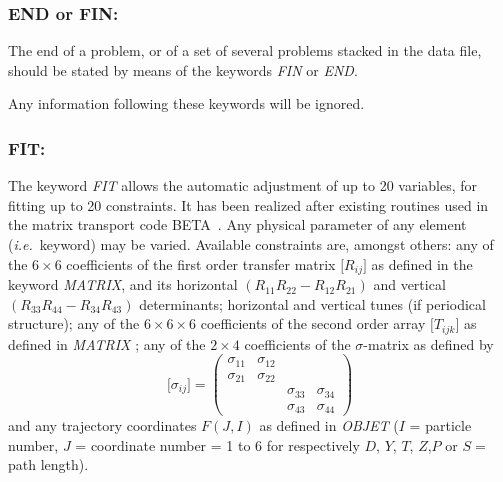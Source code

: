 \subsubsection*{END or FIN: \ENDTitl}  \label{FIN}  \label{END} 
\medskip

The end of a problem, or of a set of several problems stacked in 
the data file, should be stated by means of the keywords \textsl{FIN} or
\textsl{END}.  
\bigskip

\noindent Any information following these keywords will be ignored. 

\newpage

\subsubsection*{FIT:  \FITTitl}  \label{FIT} 
\medskip

 The keyword \textsl{FIT} allows the automatic adjustment of up to 20 
variables, for fitting up to 20 constraints. It has been realized 
after existing routines used in the matrix transport code BETA~\cite{Biblio10}. %
Any physical parameter of any element (\emph{i.e.}~keyword) may 
be varied. Available constraints  are, amongst others:  any of the $6 \times 6$
coefficients of the first order transfer matrix $ \lbrack R_{ij}\rbrack $ as defined in the
keyword \textsl{MATRIX}, and its horizontal $ (R_{11 }R_{22} -R_{12} R_{21}) $ and
vertical $ (R_{33} R_{44}- R_{34} R_{43}) $ determinants; horizontal and vertical tunes (if 
periodical structure);  any of the
$6\times 6 \times6 $ coefficients of the second order array $ \lbrack T_{ijk}\rbrack $ 
as defined in \textsl{MATRIX} ; any of the $ 2 \times 4 $ coefficients of the 
\mbox{$\sigma$-matrix} as defined by
%
$$ \lbrack \sigma_{ ij}\rbrack  = 
\begin{pmatrix}
	\sigma_{11} &  \sigma_{12} &   &  \\
	 \sigma_{21} &  \sigma_{22} &  & \\
	             &               &  \sigma_{33} & \sigma_{34} \\
	             &               & \sigma_{43} & \sigma_{44} 
\end{pmatrix}
$$
%
 and any trajectory coordinates $ F(J,I) $ as defined in \textsl{OBJET} 
($ I $  =  particle number, $ J $  = coordinate number = 1 to 6 for 
respectively $ D$, $Y$, $T$, $Z$,$ P $ or $ S= $path length). 

